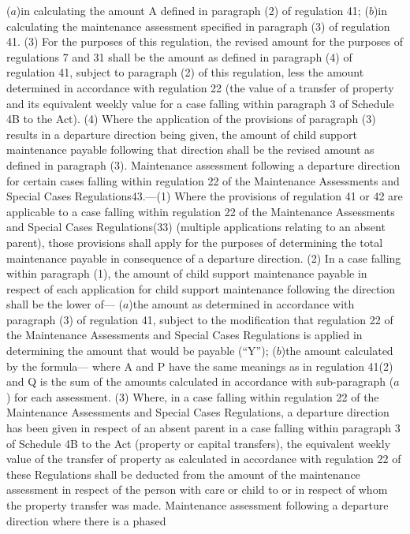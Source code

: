 \documentclass[a4paper]{article}
\begin{document}
($a$)in calculating the amount A defined in paragraph (2) of regulation 41;
($b$)in calculating the maintenance assessment specified in paragraph (3) of
regulation 41.
(3) For the purposes of this regulation, the revised amount for the purposes of
regulations 7 and 31 shall be the amount as defined in paragraph (4) of
regulation 41, subject to paragraph (2) of this regulation, less the amount
determined in accordance with regulation 22 (the value of a transfer of property
and its equivalent weekly value for a case falling within paragraph 3 of
Schedule 4B to the Act).
(4) Where the application of the provisions of paragraph (3) results in a
departure direction being given, the amount of child support maintenance payable
following that direction shall be the revised amount as defined in paragraph
(3).
Maintenance assessment following a departure direction for certain cases falling
within regulation 22 of the Maintenance Assessments and Special Cases
Regulations43.—(1) Where the provisions of regulation 41 or 42 are applicable to
a case falling within regulation 22 of the Maintenance Assessments and Special
Cases Regulations(33) (multiple applications relating to an absent parent),
those provisions shall apply for the purposes of determining the total
maintenance payable in consequence of a departure direction.
(2) In a case falling within paragraph (1), the amount of child support
maintenance payable in respect of each application for child support maintenance
following the direction shall be the lower of—
($a$)the amount as determined in accordance with paragraph (3) of regulation 41,
subject to the modification that regulation 22 of the Maintenance Assessments
and Special Cases Regulations is applied in determining the amount that would be
payable (“Y”);
($b$)the amount calculated by the formula—
where A and P have the same meanings as in regulation 41(2) and Q is the sum of
the amounts calculated in accordance with sub-paragraph ($a$) for each assessment.
(3) Where, in a case falling within regulation 22 of the Maintenance Assessments
and Special Cases Regulations, a departure direction has been given in respect
of an absent parent in a case falling within paragraph 3 of Schedule 4B to the
Act (property or capital transfers), the equivalent weekly value of the transfer
of property as calculated in accordance with regulation 22 of these Regulations
shall be deducted from the amount of the maintenance assessment in respect of
the person with care or child to or in respect of whom the property transfer was
made.
Maintenance assessment following a departure direction where there is a phased
\end{document}
